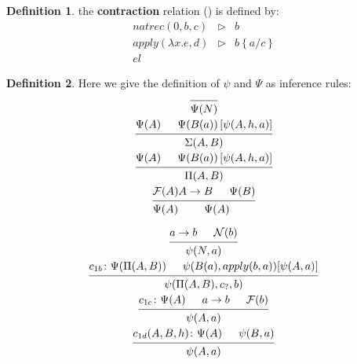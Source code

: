 \documentclass[11pt,a5paper,draft,oneside]{amsbook}
\theoremstyle{plain}%
\theoremstyle{definition}
\newtheorem{dede}{Definition}[section]
\theoremstyle{remark}
\newcommand{\ctr}{\triangleright}
\newcommand{\sbs}[3]{#1\left\lbrace #2 / #3 \right\rbrace}
\newcommand{\femph}{\textbf}
\begin{document}
	\begin{dede}
		the \femph{contraction} relation (\triangleright)
		is defined by:
		\begin{align}
		natrec(0, b, c) & \ctr & b \\
		apply(\lambda x.e, d) & \ctr & \sbs{b}{a}{c}\\
		el
		\end{align}			
	\end{dede}
	
	\begin{dede}
	Here we give the definition of $\psi$ and $\Psi$ as inference rules:
	\begin{gather}
	\begin{prooftree}
	\Infer{0}{\Psi(N)}
	\end{prooftree}	\\
	\begin{prooftree}
	\Hypo{\Psi(A)}
	\Hypo{\Psi(B(a)) \left[\psi(A,h,a)\right]}
	\Infer2{\Sigma(A,B)}		
	\end{prooftree}\\
	\begin{prooftree}
	\Hypo{\Psi(A)}
	\Hypo{\Psi(B(a)) \left[\psi(A,h,a)\right]}
	\Infer2{\Pi(A,B)}		
	\end{prooftree}\\
	\begin{prooftree}
	\Hypo{\mathcal{F}(A)}
	\Infer1{\Psi(A)}
	\end{prooftree}
	\begin{prooftree}
	\Hypo{A\rightarrow B}
	\Hypo{\Psi(B)}
	\Infer2{\Psi(A)}
	\end{prooftree}
	\end{gather}
	
	
	\begin{gather}
	\begin{prooftree}
	\Hypo{a \rightarrow b}
	\Hypo{\mathcal{N}(b) }
	\Infer2{\psi(N,a)}
	\end{prooftree}	
	\\
	\begin{prooftree}
		\Hypo{c_{1b} \colon \Psi(\Pi(A,B))}
		\Hypo{\psi(B(a), apply(b, a))[\psi(A,a)]}
		\Infer{2}{\psi(\Pi(A,B),c_?,b)}
	\end{prooftree}\\		
	\begin{prooftree}
	\Hypo{c_{1c} \colon \Psi(A)}
	\Hypo{a \rightarrow b}
	\Hypo{\mathcal{F}(b)}
	\Infer3{\psi(A,a)}
	\end{prooftree}	\\		
	\begin{prooftree}
	\Hypo{c_{1d}(A,B,h) \colon \Psi(A)}
	\Hypo{\psi(B,a)}
	\Infer2{\psi(A,a)}
	\end{prooftree}	
	\end{gather}
	

\end{dede}
\end{document}
